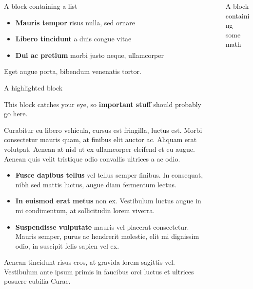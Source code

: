\documentclass[final, xcolor={svgnames}]{beamer}
\newlength{\sepwidth}
\newlength{\colwidth}
\newcommand{\separatorcolumn}{\begin{column}{\sepwidth}\end{column}}
\begin{document}
\begin{frame}[t]
\begin{columns}[t]
\begin{column}{\colwidth}
\begin{block}{A block containing a list}
    \begin{itemize}
      \item \textbf{Mauris tempor} risus nulla, sed ornare
      \item \textbf{Libero tincidunt} a duis congue vitae
      \item \textbf{Dui ac pretium} morbi justo neque, ullamcorper
    \end{itemize}

    Eget augue porta, bibendum venenatis tortor.

  \end{block}

  \begin{alertblock}{A highlighted block}

    This block catches your eye, so \textbf{important stuff} should probably go
    here.

    Curabitur eu libero vehicula, cursus est fringilla, luctus est. Morbi
    consectetur mauris quam, at finibus elit auctor ac. Aliquam erat volutpat.
    Aenean at nisl ut ex ullamcorper eleifend et eu augue. Aenean quis velit
    tristique odio convallis ultrices a ac odio.

    \begin{itemize}
      \item \textbf{Fusce dapibus tellus} vel tellus semper finibus. In
        consequat, nibh sed mattis luctus, augue diam fermentum lectus.
      \item \textbf{In euismod erat metus} non ex. Vestibulum luctus augue in
        mi condimentum, at sollicitudin lorem viverra.
      \item \textbf{Suspendisse vulputate} mauris vel placerat consectetur.
        Mauris semper, purus ac hendrerit molestie, elit mi dignissim odio, in
        suscipit felis sapien vel ex.
    \end{itemize}

    Aenean tincidunt risus eros, at gravida lorem sagittis vel. Vestibulum ante
    ipsum primis in faucibus orci luctus et ultrices posuere cubilia Curae.

  \end{alertblock}

\end{column}

\separatorcolumn

\begin{column}{\colwidth}

  \begin{block}{A block containing some math}


\end{block}
\end{column}
\end{columns}
\end{frame}
\end{document}
